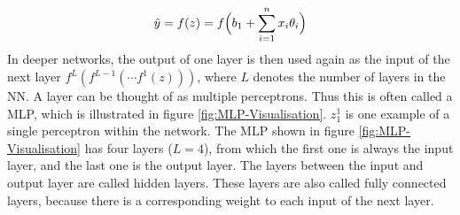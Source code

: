 \begin{equation}
    \centering
    \hat{y} = f(z) = f\Big(b_1 + \sum_{i=1}^n x_i \theta_i \Big)
    \label{eq:Perceptron-Calculate-Output}
\end{equation}
In deeper networks, the output of one layer is then used again as the input of the next layer $f^L(f^{L-1}(\cdots f^1(z)))$, where $L$ denotes the number of layers in the \gls{NN}. A layer can be thought of as multiple perceptrons. Thus this is often called a \gls{MLP}, which is illustrated in figure \ref{fig:MLP-Visualisation}. $z_1^1$ is one example of a single perceptron within the network. The \gls{MLP} shown in figure \ref{fig:MLP-Visualisation} has four layers ($L = 4$), from which the first one is always the input layer, and the last one is the output layer. The layers between the input and output layer are called hidden layers. These layers are also called fully connected layers, because there is a corresponding weight to each input of the next layer.

